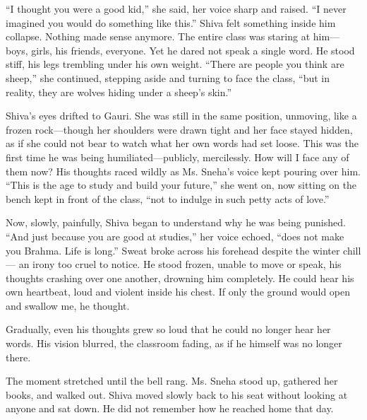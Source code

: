 ``I thought you were a good kid,'' she said, her voice sharp and raised. ``I never imagined you would do something like this.'' Shiva felt something inside him collapse. Nothing made sense anymore. The entire class was staring at him—boys, girls, his friends, everyone. Yet he dared not speak a single word. He stood stiff, his legs trembling under his own weight. ``There are people you think are sheep,'' she continued, stepping aside and turning to face the class, ``but in reality, they are wolves hiding under a sheep's skin.''

Shiva's eyes drifted to Gauri. She was still in the same position, unmoving, like a frozen rock—though her shoulders were drawn tight and her face stayed hidden, as if she could not bear to watch what her own words had set loose. This was the first time he was being humiliated—publicly, mercilessly. How will I face any of them now? His thoughts raced wildly as Ms. Sneha's voice kept pouring over him. ``This is the age to study and build your future,'' she went on, now sitting on the bench kept in front of the class, ``not to indulge in such petty acts of love.''

Now, slowly, painfully, Shiva began to understand why he was being punished. ``And just because you are good at studies,'' her voice echoed, ``does not make you Brahma. Life is long.'' Sweat broke across his forehead despite the winter chill — an irony too cruel to notice. He stood frozen, unable to move or speak, his thoughts crashing over one another, drowning him completely. He could hear his own heartbeat, loud and violent inside his chest. If only the ground would open and swallow me, he thought.

Gradually, even his thoughts grew so loud that he could no longer hear her words. His vision blurred, the classroom fading, as if he himself was no longer there.

The moment stretched until the bell rang. Ms. Sneha stood up, gathered her books, and walked out. Shiva moved slowly back to his seat without looking at anyone and sat down. He did not remember how he reached home that day.